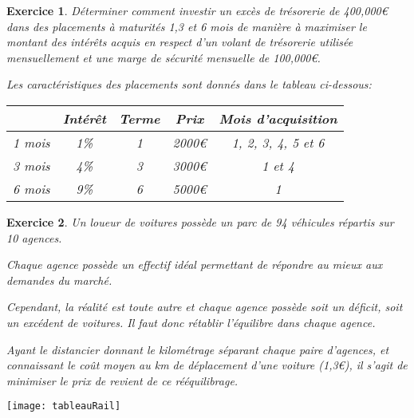 \documentclass[french]{beamer}
\newtheorem{exercice}{Exercice}
\begin{document}
\begin{frame}
  \begin{exercice}
    Déterminer  comment investir  un excès  de trésorerie  de 400,000€  dans des
    placements à maturités 1,3  et 6 mois de manière à  maximiser le montant des
    intérêts acquis en respect d'un  volant de trésorerie utilisée mensuellement
    et une marge de sécurité mensuelle de 100,000€.

    Les caractéristiques des placements sont donnés dans le tableau ci-dessous:

    \begin{center}
    \begin{tabular}{|c|c|c|c|c|}
      \cline{2-5}
     \multicolumn{1}{c|}{}&Intérêt&Terme&Prix&Mois d'acquisition\\
            \hline
    1 mois&1\%&1&2000€&1, 2, 3, 4, 5 et 6\\
            \hline
      3 mois&4\%&3&3000€&1 et 4\\
            \hline
      6 mois&9\%&6&5000€&1 \\
           \hline
    \end{tabular}
  \end{center}
\end{exercice}
\end{frame}







\begin{frame}
  \begin{exercice}
    Un  loueur de  voitures possède  un  parc de  94 véhicules  répartis sur  10
    agences.

    Chaque agence  possède un effectif idéal permettant  de répondre au
    mieux aux demandes du marché.

    Cependant, la  réalité est  toute autre  et
    chaque agence possède soit un déficit, soit un excédent de voitures. Il faut
    donc rétablir l’équilibre dans chaque agence.

    Ayant le distancier donnant le
    kilométrage séparant chaque paire d’agences, et connaissant le coût moyen au
    km de  déplacement d’une voiture (1,3€),  il s’agit de minimiser  le prix de
    revient de ce rééquilibrage. 
  \end{exercice}
\end{frame}



\begin{frame}
   
\begin{center}
  \texttt{[image: tableauRail]}
\end{center}
\end{frame}
\end{document}
